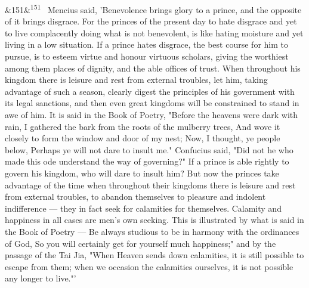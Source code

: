 \documentclass[12pt]{article}
\newcommand{\para}[1][]{\par\noindent\ifx&#1&\else\textsuperscript{\footnotesize #1}~\fi}
\begin{document}
\para[151] Mencius said, 'Benevolence brings glory to a prince, and the opposite of it brings disgrace. For the princes of the present day to hate disgrace and yet to live complacently doing what is not benevolent, is like hating moisture and yet living in a low situation. If a prince hates disgrace, the best course for him to pursue, is to esteem virtue and honour virtuous scholars, giving the worthiest among them places of dignity, and the able offices of trust. When throughout his kingdom there is leisure and rest from external troubles, let him, taking advantage of such a season, clearly digest the principles of his government with its legal sanctions, and then even great kingdoms will be constrained to stand in awe of him. It is said in the Book of Poetry, "Before the heavens were dark with rain, I gathered the bark from the roots of the mulberry trees, And wove it closely to form the window and door of my nest; Now, I thought, ye people below, Perhaps ye will not dare to insult me." Confucius said, "Did not he who made this ode understand the way of governing?" If a prince is able rightly to govern his kingdom, who will dare to insult him? But now the princes take advantage of the time when throughout their kingdoms there is leisure and rest from external troubles, to abandon themselves to pleasure and indolent indifference --- they in fact seek for calamities for themselves. Calamity and happiness in all cases are men's own seeking. This is illustrated by what is said in the Book of Poetry --- Be always studious to be in harmony with the ordinances of God, So you will certainly get for yourself much happiness;" and by the passage of the Tai Jia, "When Heaven sends down calamities, it is still possible to escape from them; when we occasion the calamities ourselves, it is not possible any longer to live."'
\end{document}
